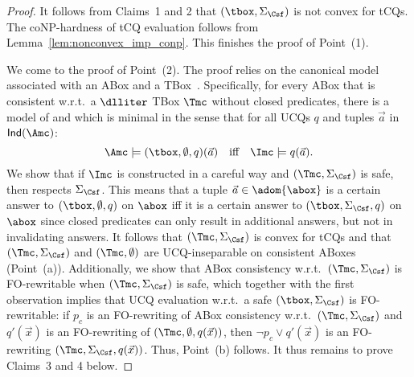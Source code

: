 \documentclass{lmcs}
\theoremstyle{definition}
\begin{document}
\begin{proof}
It follows from Claims~1 and 2 that $(\tbox,\Sigma_{\Csf})$ is not convex for tCQs. The coNP-hardness of
tCQ evaluation follows from Lemma~\ref{lem:nonconvex_imp_conp}. This finishes the proof of Point~(1).

We come to the proof of Point~(2). The 
proof relies on the canonical model associated with an ABox 
and a \dlliter TBox~\cite{CDLLR07,DBLP:conf/kr/KontchakovLTWZ10}. 
Specifically, for every ABox \Amc 
that is consistent w.r.t.~a $\dlliter$ TBox $\Tmc$ without closed predicates, there is a model 
\Imc of \Amc and \Tmc which is minimal in the sense that for all UCQs $q$ and tuples 
$\vec{a}$ in ${\sf Ind}(\Amc)$:
$$
\Amc\models(\tbox,\emptyset, q)(\vec{a}) \quad \text{iff} \quad \Imc \models q(\vec{a}).
$$
We show that if $\Imc$ is constructed in a careful way and 
$(\Tmc,\Sigma_\Csf)$ is safe, then \Imc respects $\Sigma_\Csf$. This means 
that a tuple $\vec{a}\in\adom{\abox}$ is a certain answer to 
$(\tbox,\emptyset, q)$ on $\abox$ iff it is 
a certain answer to $(\tbox,\Sigma_\Csf,q)$ on $\abox$ since 
closed predicates can only result in additional answers, but not in invalidating answers. It follows that $(\Tmc,\Sigma_{\Csf})$ is
convex for tCQs and that $(\Tmc,\Sigma_{\Csf})$ and 
$(\Tmc,\emptyset)$ are UCQ-inseparable on consistent ABoxes (Point~(a)). 
Additionally, we show that ABox consistency w.r.t.\ $(\Tmc,\Sigma_\Csf)$ is FO-rewritable when 
$(\Tmc,\Sigma_\Csf)$ is safe, which together with the first observation implies that UCQ evaluation w.r.t.\ a safe $(\tbox,\Sigma_{\Csf})$ is FO-rewritable: 
if $p_{c}$ is an FO-rewriting of ABox consistency w.r.t.~$(\Tmc,\Sigma_{\Csf})$ and $q'(\vec{x})$ is an 
FO-rewriting of 
$(\Tmc,\emptyset,q(\vec{x}))$, then $\neg p_{c}\vee q'(\vec{x})$ is an FO-rewriting 
$(\Tmc,\Sigma_{\Csf},q(\vec{x}))$.
Thus, Point~(b) follows. It thus remains to prove Claims~3 and 4 below.


\end{proof}
\end{document}
